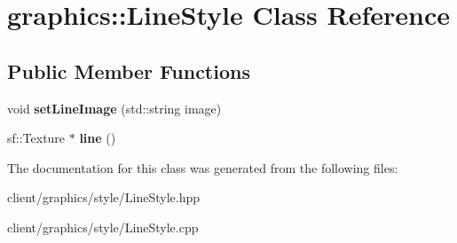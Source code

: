 \hypertarget{classgraphics_1_1_line_style}{\section{graphics\-:\-:Line\-Style Class Reference}
\label{classgraphics_1_1_line_style}
}
\subsection*{Public Member Functions}
\begin{DoxyCompactItemize}
\item 
\hypertarget{classgraphics_1_1_line_style_ad3dd3424e27a501f21344d43f1d381b0}{void {\bfseries set\-Line\-Image} (std\-::string image)}\label{classgraphics_1_1_line_style_ad3dd3424e27a501f21344d43f1d381b0}

\item 
\hypertarget{classgraphics_1_1_line_style_add2d243534fdfa521dc348da987382f0}{sf\-::\-Texture $\ast$ {\bfseries line} ()}\label{classgraphics_1_1_line_style_add2d243534fdfa521dc348da987382f0}

\end{DoxyCompactItemize}


The documentation for this class was generated from the following files\-:\begin{DoxyCompactItemize}
\item 
client/graphics/style/Line\-Style.\-hpp\item 
client/graphics/style/Line\-Style.\-cpp\end{DoxyCompactItemize}

